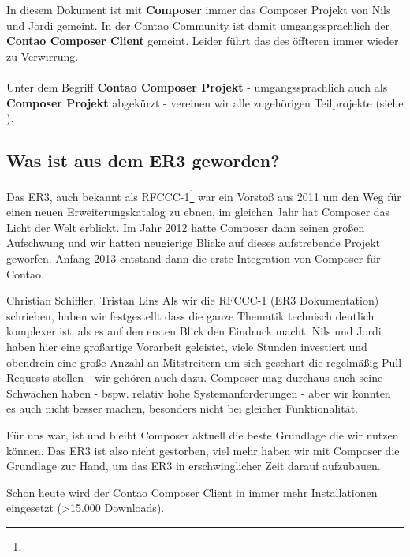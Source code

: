 \documentclass[
paper=a4,
draft=false,%
fontsize=10pt%
]{scrartcl}
\begin{document}
\begin{info}
In diesem Dokument ist mit \textbf{Composer} immer das Composer Projekt von Nils und Jordi gemeint.
In der Contao Community ist damit umgangssprachlich der \textbf{Contao Composer Client} gemeint.
Leider führt das des öffteren immer wieder zu Verwirrung. \\
\\
Unter dem Begriff \textbf{Contao Composer Projekt} - umgangssprachlich auch als \textbf{Composer Projekt} abgekürzt - vereinen wir alle zugehörigen Teilprojekte (siehe ).
\end{info}

\subsection{Was ist aus dem ER3 geworden?}

Das ER3, auch bekannt als RFCCC-1\footnote{} war ein Vorstoß aus 2011 um den Weg für einen neuen Erweiterungskatalog zu ebnen, im gleichen Jahr hat Composer das Licht der Welt erblickt. Im Jahr 2012 hatte Composer dann seinen großen Aufschwung und wir hatten neugierige Blicke auf dieses aufstrebende Projekt geworfen. Anfang 2013 entstand dann die erste Integration von Composer für Contao.

\begin{emquote}{Christian Schiffler, Tristan Lins}
Als wir die RFCCC-1 (ER3 Dokumentation) schrieben, haben wir festgestellt dass die ganze Thematik  technisch deutlich komplexer ist, als es auf den ersten Blick den Eindruck macht. Nils und Jordi haben hier eine großartige Vorarbeit geleistet, viele Stunden investiert und obendrein eine große Anzahl an Mitstreitern um sich geschart die regelmäßig Pull Requests stellen - wir gehören auch dazu. Composer mag durchaus auch seine Schwächen haben - bspw. relativ hohe Systemanforderungen - aber wir könnten es auch nicht besser machen, besonders nicht bei gleicher Funktionalität.
\end{emquote}

Für uns war, ist und bleibt Composer aktuell die beste Grundlage die wir nutzen können. Das ER3 ist also nicht gestorben, viel mehr haben wir mit Composer die Grundlage zur Hand, um das ER3 in erschwinglicher Zeit darauf aufzubauen.

Schon heute wird der Contao Composer Client in immer mehr Installationen eingesetzt (>15.000 Downloads).
\end{document}
